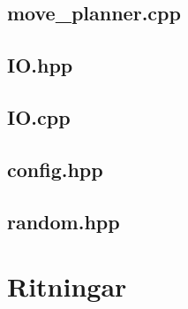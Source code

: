 \documentclass[a4paper]{article}
\begin{document}
\begin{appendix}
\subsection{move\_planner.cpp}

\subsection{IO.hpp}

\subsection{IO.cpp}

\subsection{config.hpp}

\subsection{random.hpp}


\section{Ritningar}
\label{sketches}

\end{appendix}
\end{document}
